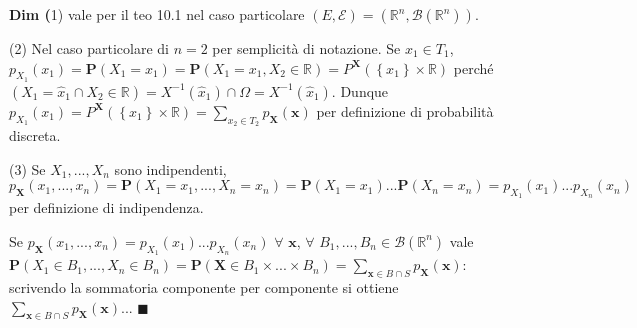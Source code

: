 \documentclass{article}
\begin{document}
\textbf{Dim (}1) vale per il teo 10.1 nel caso particolare $\left( E,%
\mathcal{E}\right) =\left( 
\mathbb{R}
^{n},\mathcal{B}\left( 
\mathbb{R}
^{n}\right) \right) $.

(2) Nel caso particolare di $n=2$ per semplicit\`{a} di notazione. Se $%
x_{1}\in T_{1}$, $p_{X_{1}}\left( x_{1}\right) =\mathbf{P}\left(
X_{1}=x_{1}\right) =\mathbf{P}\left( X_{1}=x_{1},X_{2}\in 
\mathbb{R}
\right) =P^{\mathbf{X}}\left( \left\{ x_{1}\right\} \times 
\mathbb{R}
\right) $ perch\'{e} $\left( X_{1}=\hat{x}_{1}\cap X_{2}\in 
\mathbb{R}
\right) =X^{-1}\left( \hat{x}_{1}\right) \cap \Omega =X^{-1}\left( \hat{x}%
_{1}\right) $. Dunque $p_{X_{1}}\left( x_{1}\right) =P^{\mathbf{X}}\left(
\left\{ x_{1}\right\} \times 
\mathbb{R}
\right) =\sum_{x_{2}\in T_{2}}p_{\mathbf{X}}\left( \mathbf{x}\right) $ per
definizione di probabilit\`{a} discreta.

(3) Se $X_{1},...,X_{n}$ sono indipendenti, $p_{\mathbf{X}}\left(
x_{1},...,x_{n}\right) =\mathbf{P}\left( X_{1}=x_{1},...,X_{n}=x_{n}\right) =%
\mathbf{P}\left( X_{1}=x_{1}\right) ...\mathbf{P}\left( X_{n}=x_{n}\right)
=p_{X_{1}}\left( x_{1}\right) ...p_{X_{n}}\left( x_{n}\right) $ per
definizione di indipendenza.

Se $p_{\mathbf{X}}\left( x_{1},...,x_{n}\right) =p_{X_{1}}\left(
x_{1}\right) ...p_{X_{n}}\left( x_{n}\right) $ $\forall $ $\mathbf{x}$, $%
\forall $ $B_{1},...,B_{n}\in \mathcal{B}\left( 
\mathbb{R}
^{n}\right) $ vale $\mathbf{P}\left( X_{1}\in B_{1},...,X_{n}\in
B_{n}\right) =\mathbf{P}\left( \mathbf{X}\in B_{1}\times ...\times
B_{n}\right) =\sum_{\mathbf{x}\in B\cap S}p_{\mathbf{X}}\left( \mathbf{x}%
\right) $: scrivendo la sommatoria componente per componente si ottiene $%
\sum_{\mathbf{x}\in B\cap S}p_{\mathbf{X}}\left( \mathbf{x}\right) $... $%
\blacksquare $
\end{document}
